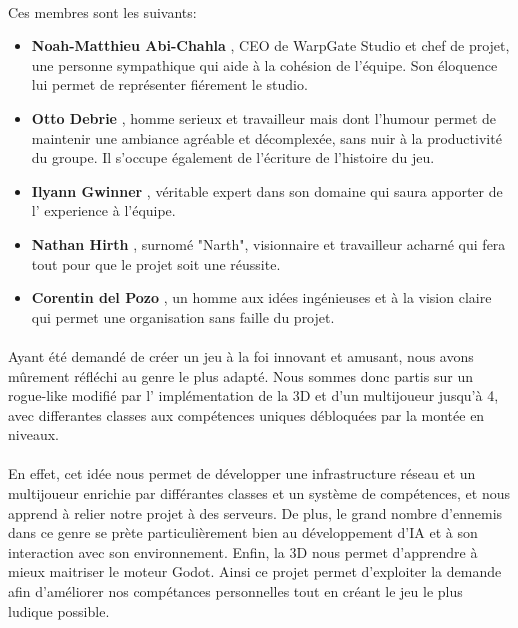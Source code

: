 \documentclass{article}
\begin{document}
\paragraph{}
Ces membres sont les suivants:
\begin{itemize}
\item[\textbullet] \textbf{Noah-Matthieu Abi-Chahla} , CEO de WarpGate Studio et chef de projet, une personne sympathique qui aide à la cohésion de l'équipe. Son éloquence lui permet de représenter fiérement le studio.
\item[\textbullet] \textbf{Otto Debrie} , homme serieux et travailleur mais dont l'humour permet de maintenir une ambiance agréable et décomplexée, sans nuir à la productivité du groupe. Il s'occupe également de l'écriture de l'histoire du jeu.
\item[\textbullet] \textbf{Ilyann Gwinner} , véritable expert dans son domaine qui saura apporter de l' experience à l'équipe.
\item[\textbullet] \textbf{Nathan Hirth} , surnomé "Narth", visionnaire et travailleur acharné qui fera tout pour que le projet soit une réussite.
\item[\textbullet] \textbf{Corentin del Pozo} , un homme aux idées ingénieuses et à la vision claire qui permet une organisation sans faille du projet.
\end{itemize}
\paragraph{}
Ayant \'et\'e demand\'e de cr\'eer un jeu \`a la foi innovant et amusant, nous avons m\^urement r\'efl\'echi au genre le plus adapt\'e. Nous sommes donc partis sur un rogue-like modifi\'e par l' impl\'ementation de la 3D et d'un multijoueur jusqu'\`a 4, avec differantes classes aux comp\'etences uniques d\'ebloqu\'ees par la mont\'ee en niveaux. 

\paragraph{}
En effet, cet id\'ee nous permet de d\'evelopper une infrastructure r\'eseau et un multijoueur enrichie par diff\'erantes classes et un syst\`eme de comp\'etences, et nous apprend \`a relier notre projet \`a des serveurs. De plus, le grand nombre d'ennemis dans ce genre se pr\`ete particuli\`erement bien au d\'eveloppement d'IA et à son interaction avec son environnement. Enfin, la 3D nous permet d'apprendre \`a mieux maitriser le moteur Godot. Ainsi ce projet permet d'exploiter la demande afin d'am\'eliorer nos comp\'etances personnelles tout en cr\'eant le jeu le plus ludique possible.
\end{document}
